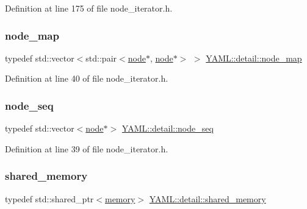 Definition at line 175 of file node\+\_\+iterator.\+h.

\mbox{\label{namespace_y_a_m_l_1_1detail_aab320a73357e3a299eff450ea378e1b2}} 
\subsubsection{\texorpdfstring{node\_map}{node\_map}}
{\footnotesize\ttfamily typedef std\+::vector$<$std\+::pair$<$\mbox{\hyperlink{class_y_a_m_l_1_1detail_1_1node}{node}}$\ast$, \mbox{\hyperlink{class_y_a_m_l_1_1detail_1_1node}{node}}$\ast$$>$ $>$ \mbox{\hyperlink{namespace_y_a_m_l_1_1detail_aab320a73357e3a299eff450ea378e1b2}{Y\+A\+M\+L\+::detail\+::node\+\_\+map}}}



Definition at line 40 of file node\+\_\+iterator.\+h.

\mbox{\label{namespace_y_a_m_l_1_1detail_a36e15ea9f5f8cbc5299e4d7a26995351}} 
\subsubsection{\texorpdfstring{node\_seq}{node\_seq}}
{\footnotesize\ttfamily typedef std\+::vector$<$\mbox{\hyperlink{class_y_a_m_l_1_1detail_1_1node}{node}}$\ast$$>$ \mbox{\hyperlink{namespace_y_a_m_l_1_1detail_a36e15ea9f5f8cbc5299e4d7a26995351}{Y\+A\+M\+L\+::detail\+::node\+\_\+seq}}}



Definition at line 39 of file node\+\_\+iterator.\+h.

\mbox{\label{namespace_y_a_m_l_1_1detail_ab961bbe6cc8b2322dafbf562feb9f8b4}} 
\subsubsection{\texorpdfstring{shared\_memory}{shared\_memory}}
{\footnotesize\ttfamily typedef std\+::shared\+\_\+ptr$<$\mbox{\hyperlink{class_y_a_m_l_1_1detail_1_1memory}{memory}}$>$ \mbox{\hyperlink{namespace_y_a_m_l_1_1detail_ab961bbe6cc8b2322dafbf562feb9f8b4}{Y\+A\+M\+L\+::detail\+::shared\+\_\+memory}}}



